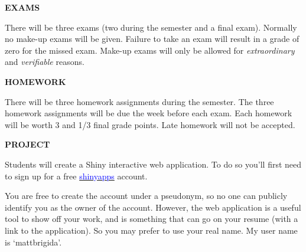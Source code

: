 \documentclass{article}
\begin{document}
\begin{center}
{\bf EXAMS} 
\end{center}
There will be three exams (two during the semester and a final exam). Normally no make-up exams will be given.  Failure to take an exam will result in a grade of zero for the missed exam.  Make-up exams will only be allowed for {\it extraordinary} and {\it verifiable} reasons.\\
\begin{center}
{\bf HOMEWORK} 
\end{center}
There will be three homework assignments during the semester. The three homework assignments will be due the week before each exam. Each homework will be worth 3 and 1/3 final grade points. Late homework will not be accepted.
\begin{center}
{\bf PROJECT}
\end{center}
Students will create a Shiny interactive web application.  To do so you'll first need to sign up for a free \href{https://www.shinyapps.io/}{\textcolor{blue}{shinyapps}} account.  

You are free to create the account under a pseudonym, so no one can publicly identify you as the owner of the account.  However, the web application is a useful tool to show off your work, and is something that can go on your resume (with a link to the application).  So you may prefer to use your real name.  My user name is `mattbrigida'.  
\end{document}
